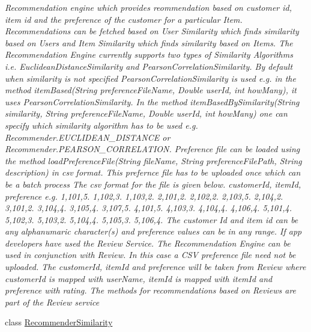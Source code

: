 \begin{DoxyCompactItemize}
\begin{DoxyCompactList}\small\item\em Recommendation engine which provides reommendation based on customer id, item id and the preference of the customer for a particular Item. Recommendations can be fetched based on User Similarity which finds similarity based on Users and Item Similarity which finds similarity based on Items. The Recommendation Engine currently supports two types of Similarity Algorithms i.\+e. Euclidean\+Distance\+Similarity and Pearson\+Correlation\+Similarity. By default when similarity is not specified Pearson\+Correlation\+Similarity is used e.\+g. in the method item\+Based(\+String preference\+File\+Name, Double   user\+Id, int  how\+Many), it uses Pearson\+Correlation\+Similarity. In the method item\+Based\+By\+Similarity(\+String similarity, String preference\+File\+Name, Double   user\+Id, int  how\+Many) one can specify which similarity algorithm has to be used e.\+g. Recommender.\+E\+U\+C\+L\+I\+D\+E\+A\+N\+\_\+\+D\+I\+S\+T\+A\+N\+C\+E or Recommender.\+P\+E\+A\+R\+S\+O\+N\+\_\+\+C\+O\+R\+R\+E\+L\+A\+T\+I\+O\+N. Preference file can be loaded using the method load\+Preference\+File(\+String file\+Name, String preference\+File\+Path, String description) in csv format. This prefernce file has to be uploaded once which can be a batch process The csv format for the file is given below. customer\+Id, item\+Id, preference e.\+g. 1,101,5. 1,102,3. 1,103,2. 2,101,2. 2,102,2. 2,103,5. 2,104,2. 3,101,2. 3,104,4. 3,105,4. 3,107,5. 4,101,5. 4,103,3. 4,104,4. 4,106,4. 5,101,4. 5,102,3. 5,103,2. 5,104,4. 5,105,3. 5,106,4. The customer Id and item id can be any alphanumaric character(s) and preference values can be in any range. If app developers have used the Review Service. The Recommendation Engine can be used in conjunction with Review. In this case a C\+S\+V preference file need not be uploaded. The customer\+Id, item\+Id and preference will be taken from Review where customer\+Id is mapped with user\+Name, item\+Id is mapped with item\+Id and preference with rating. The methods for recommendations based on Reviews are part of the Review service \end{DoxyCompactList}\item 
class \hyperlink{classcom_1_1shephertz_1_1app42_1_1paas_1_1sdk_1_1csharp_1_1recommend_1_1_recommender_similarity}{Recommender\+Similarity}
\end{DoxyCompactItemize}
